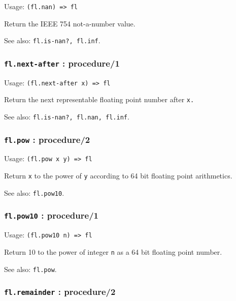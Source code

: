 \documentclass[
]{article}
\newcommand{\passthrough}[1]{#1}
\begin{document}
Usage: \passthrough{\lstinline!(fl.nan) => fl!}

Return the IEEE 754 not-a-number value.

See also: \passthrough{\lstinline!fl.is-nan?, fl.inf!}.

\hypertarget{fl.next-after-procedure1}{%
\subsubsection{\texorpdfstring{\texttt{fl.next-after} :
procedure/1}{fl.next-after : procedure/1}}\label{fl.next-after-procedure1}}

Usage: \passthrough{\lstinline!(fl.next-after x) => fl!}

Return the next representable floating point number after
\passthrough{\lstinline!x.!}

See also: \passthrough{\lstinline!fl.is-nan?, fl.nan, fl.inf!}.

\hypertarget{fl.pow-procedure2}{%
\subsubsection{\texorpdfstring{\texttt{fl.pow} :
procedure/2}{fl.pow : procedure/2}}\label{fl.pow-procedure2}}

Usage: \passthrough{\lstinline!(fl.pow x y) => fl!}

Return \passthrough{\lstinline!x!} to the power of
\passthrough{\lstinline!y!} according to 64 bit floating point
arithmetics.

See also: \passthrough{\lstinline!fl.pow10!}.

\hypertarget{fl.pow10-procedure1}{%
\subsubsection{\texorpdfstring{\texttt{fl.pow10} :
procedure/1}{fl.pow10 : procedure/1}}\label{fl.pow10-procedure1}}

Usage: \passthrough{\lstinline!(fl.pow10 n) => fl!}

Return 10 to the power of integer \passthrough{\lstinline!n!} as a 64
bit floating point number.

See also: \passthrough{\lstinline!fl.pow!}.

\hypertarget{fl.remainder-procedure2}{%
\subsubsection{\texorpdfstring{\texttt{fl.remainder} :
procedure/2}{fl.remainder : procedure/2}}\label{fl.remainder-procedure2}}
\end{document}
